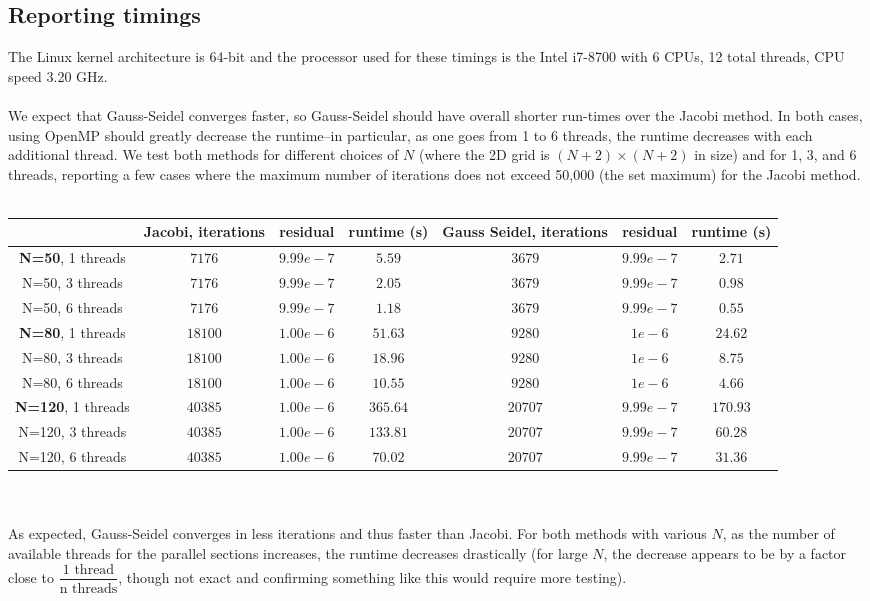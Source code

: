 \documentclass[10pt, letterpaper]{article}
\begin{document}
\subsection{Reporting timings}
The Linux kernel architecture is 64-bit and the processor used for these timings is the Intel i7-8700 with 6 CPUs, 12 total threads, CPU speed 3.20 GHz.\\\\
We expect that Gauss-Seidel converges faster, so Gauss-Seidel should have overall shorter run-times over the Jacobi method. In both cases, using OpenMP should greatly decrease the runtime--in particular, as one goes from 1 to 6 threads, the runtime decreases with each additional thread. We test both methods for different choices of $N$ (where the 2D grid is $(N+2)\times(N+2)$ in size) and for 1, 3, and 6 threads, reporting a few cases where the maximum number of iterations does not exceed 50,000 (the set maximum) for the Jacobi method.\\\\
\begin{tabular}{|c||c|c|c||c|c|c|}
  \hline
   & \textbf{Jacobi}, iterations & residual & runtime (s) & \textbf{Gauss Seidel}, iterations & residual & runtime (s)\\ \hline \hline
  \textbf{N=50}, 1 threads & $7176$ & $9.99e-7$ & $5.59$ & $3679$ & $9.99e-7$ & $2.71$ \\ \hline
  N=50, 3 threads & $7176$ & $9.99e-7$ & $2.05$ & $3679$ & $9.99e-7$ & $0.98$ \\ \hline
  N=50, 6 threads & $7176$ & $9.99e-7$ & $1.18$ & $3679$ & $9.99e-7$ & $0.55$ \\ \hline \hline
  \textbf{N=80}, 1 threads & $18100$ & $1.00e-6$ & $51.63$ & $9280$ & $1e-6$ & $24.62$\\ \hline
  N=80, 3 threads & $18100$ & $1.00e-6$ & $18.96$ & $9280$ & $1e-6$ & $8.75$ \\ \hline
  N=80, 6 threads & $18100$ & $1.00e-6$ & $10.55$ & $9280$ & $1e-6$ & $4.66$ \\ \hline \hline
  \textbf{N=120}, 1 threads & $40385$ & $1.00e-6$ & $365.64$ & $20707$ & $9.99e-7$ & $170.93$ \\ \hline
  N=120, 3 threads & $40385$ & $1.00e-6$ & $133.81$ &  $20707$ & $9.99e-7$ & $60.28$\\ \hline
  N=120, 6 threads & $40385$ & $1.00e-6$ & $70.02$ & $20707$ & $9.99e-7$ & $31.36$\\ \hline
  \hline
\end{tabular}\\\\
As expected, Gauss-Seidel converges in less iterations and thus faster than Jacobi. For both methods with various $N$, as the number of available threads for the parallel sections increases, the runtime decreases drastically (for large $N$, the decrease appears to be by a factor close to $\dfrac{\text{1 thread}}{\text{n threads}}$, though not exact and confirming something like this would require more testing).
\end{document}
